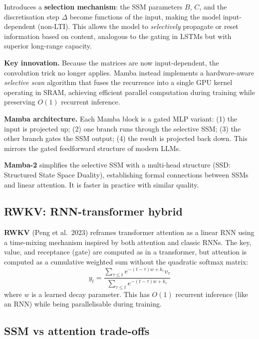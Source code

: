\begin{paperbox}[title={Mamba (Gu \& Dao 2023)}]
  Introduces a \textbf{selection mechanism}: the SSM parameters $B$, $C$, and the
  discretisation step $\Delta$ become functions of the input, making the model
  input-dependent (non-LTI). This allows the model to \emph{selectively} propagate
  or reset information based on content, analogous to the gating in LSTMs but
  with superior long-range capacity.
\end{paperbox}

\textbf{Key innovation.} Because the matrices are now input-dependent, the convolution
trick no longer applies. Mamba instead implements a hardware-aware \emph{selective scan}
algorithm that fuses the recurrence into a single GPU kernel operating in SRAM, achieving
efficient parallel computation during training while preserving $O(1)$ recurrent inference.

\textbf{Mamba architecture.} Each Mamba block is a gated MLP variant:
(1) the input is projected up; (2) one branch runs through the selective SSM;
(3) the other branch gates the SSM output; (4) the result is projected back down.
This mirrors the gated feedforward structure of modern LLMs.

\textbf{Mamba-2} simplifies the selective SSM with a multi-head structure (SSD:
Structured State Space Duality), establishing formal connections between SSMs and
linear attention. It is faster in practice with similar quality.

\subsection{RWKV: RNN-transformer hybrid}

\textbf{RWKV} (Peng et al.\ 2023) reframes transformer attention as a linear RNN using
a time-mixing mechanism inspired by both attention and classic RNNs. The key, value,
and receptance (gate) are computed as in a transformer, but attention is computed as a
cumulative weighted sum without the quadratic softmax matrix:
\[
  y_t = \frac{\sum_{\tau \leq t} e^{-(t-\tau) w + k_\tau} v_\tau}{\sum_{\tau \leq t} e^{-(t-\tau)w + k_\tau}}
\]
where $w$ is a learned decay parameter. This has $O(1)$ recurrent inference (like an
RNN) while being parallelisable during training.

\subsection{SSM vs attention trade-offs}

